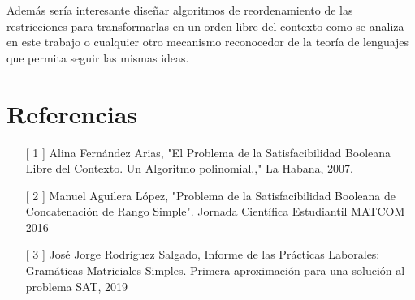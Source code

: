 \documentclass{article}
\begin{document}
Además sería interesante diseñar algoritmos de reordenamiento de las restricciones para transformarlas en un orden libre del contexto como se analiza en este trabajo
o cualquier otro mecanismo reconocedor de la teoría de lenguajes que permita seguir las mismas ideas.

\section*{Referencias}


\begin{enumerate}
    \item[[ 1]] Alina Fernández Arias, "El Problema de la
    Satisfacibilidad Booleana Libre del Contexto.
    Un Algoritmo polinomial.," La Habana, 2007.
    \item[[ 2]] Manuel Aguilera López, "Problema de la Satisfacibilidad Booleana de Concatenación de Rango Simple". Jornada Científica Estudiantil MATCOM 2016
    \item[[ 3]] José Jorge Rodríguez Salgado, Informe de las Prácticas Laborales: Gramáticas Matriciales
    Simples. Primera aproximación para una solución al
    problema SAT, 2019    
\end{enumerate}
 
\end{document}
